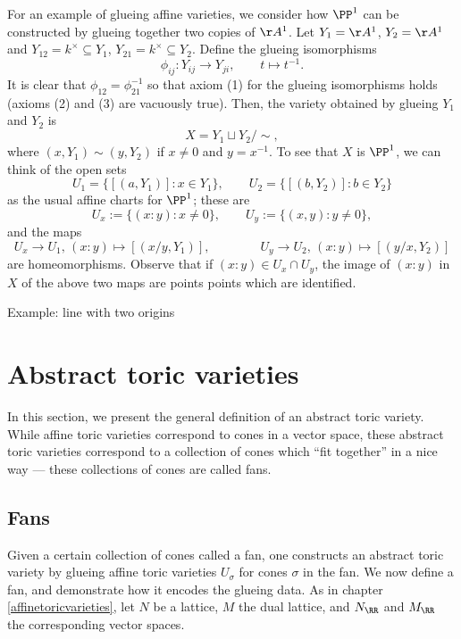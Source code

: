\begin{example}
For an example of glueing affine varieties, we consider how $\PP^1$ can be constructed by glueing together two copies of $\AA^1$.
Let $Y_1=\AA^1$, $Y_2 = \AA^1$ and $Y_{12} = k^\times \subseteq Y_1$, $Y_{21} = k^\times \subseteq Y_2$.
Define the glueing isomorphisms
$$\phi_{ij} : Y_{ij} \to Y_{ji}, \qquad t \mapsto t^{-1}.$$
It is clear that $\phi_{12} = \phi_{21}^{-1}$ so that axiom (1) for the glueing isomorphisms holds (axioms (2) and (3) are vacuously true).
Then, the variety obtained by glueing $Y_1$ and $Y_2$ is
$$X = Y_1 \sqcup Y_2 / \sim,$$
where $(x, Y_1) \sim (y, Y_2)$ if $x \ne 0$ and $y = x^{-1}$.
To see that $X$ is $\PP^1$, we can  think of the open sets
$$U_1 = \{[(a, Y_1)] : x \in Y_1\}, \qquad U_2 = \{[(b, Y_2)] : b \in Y_2\}$$
as the usual affine charts for $\PP^1$;
these are
$$U_x := \{(x:y) : x \ne 0\}, \qquad U_y := \{(x, y) : y \ne 0\},$$
and the maps
$$U_x \to U_1, \, (x : y)\mapsto [(x/y, Y_1)], \qquad \qquad U_y \to U_2, \, (x : y)\mapsto [(y/x, Y_2)]$$
are homeomorphisms.
Observe that if $(x : y) \in U_x \cap U_y$, the image of $(x : y)$ in $X$ of the above two maps are points points which are identified.
\end{example}

Example: line with two origins










\newpage
{}
\section{Abstract toric varieties}
In this section, we present the general definition of an abstract toric variety.
While affine toric varieties correspond to cones in a vector space, these abstract toric varieties correspond to a collection of cones which ``fit together'' in a nice way --- these collections of cones are called fans.





\subsection{Fans}
Given a certain collection of cones called a fan, one constructs an abstract toric variety by glueing affine toric varieties $U_\sigma$ for cones $\sigma$ in the fan.
We now define a fan, and demonstrate how it encodes the glueing data.
As in chapter \ref{affinetoricvarieties}, let $N$ be a lattice, $M$ the dual lattice, and $N_\RR$ and $M_\RR$ the corresponding vector spaces.

